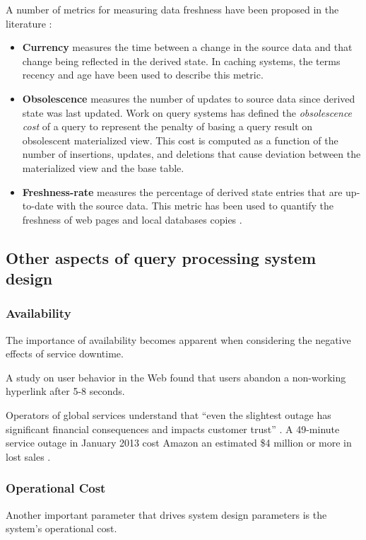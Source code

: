 A number of metrics for measuring data freshness have been proposed in the literature \cite{bouzeghoub:datafreshness}:
\begin{itemize}
  \item \textbf{Currency} measures the time between a change in the source data and that change being reflected in
  the derived state.
  In caching systems, the terms recency \cite{bright:latencyrecency} and age \cite{cho:dbfreshness}
  have been used to describe this metric.
  \item \textbf{Obsolescence} measures the number of updates to source data since derived state was last updated.
  Work on query systems has defined the \textit{obsolescence cost} \cite{avigdor:obsolescent} of a query to represent
  the penalty of basing a query result on obsolescent materialized view.
  This cost is computed as a function of the number of insertions, updates, and deletions that cause deviation between
  the materialized view and the base table.
  \item \textbf{Freshness-rate} measures the percentage of derived state entries that are up-to-date with the source
  data.
  This metric has been used to quantify the freshness of web pages \cite{labrinidis:balancingperfomancefreshness} and
  local databases copies \cite{cho:dbfreshness}.
\end{itemize}

\subsection{Other aspects of query processing system design}

\subsubsection{Availability}
The importance of availability becomes apparent when considering the negative effects of service downtime.

A study on user behavior in the Web \cite{nah:waitingtime} found that users abandon a non-working hyperlink after
5-8 seconds.

Operators of global services understand that ``even the slightest outage has significant financial
consequences and impacts customer trust'' \cite{deCandia:dynamo}.
A 49-minute service outage in January 2013 cost Amazon an estimated \$4 million or more in lost sales
\cite{infoworld:cloudoutages}.

\subsubsection{Operational Cost}
Another important parameter that drives system design parameters is the system's operational cost.

